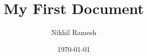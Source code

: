 \documentclass[a4paper,12pt]{report}
\begin{document}
\title{My First Document}
\author{Nikhil Ramesh}
\date{\today}
\maketitle
\end{document}
